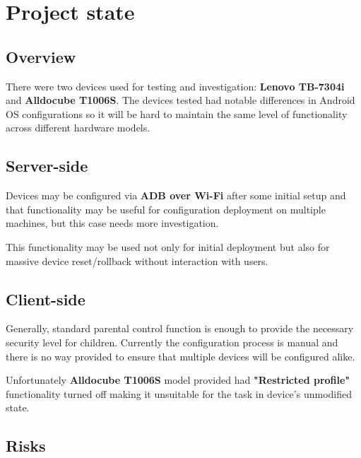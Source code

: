 \part{Project state}

\chapter{Overview}

There were two devices used for testing and investigation:
\textbf{Lenovo TB-7304i} and \textbf{Alldocube T1006S}. The devices
tested had notable differences in Android OS configurations so it
will be hard to maintain the same level of functionality across
different hardware models.

\chapter{Server-side}

Devices may be configured via \textbf{ADB over Wi-Fi} after some initial
setup and that functionality may be useful for configuration deployment
on multiple machines, but this case needs more investigation.

This functionality may be used not only for initial deployment but also
for massive device reset/rollback without interaction with users.

\chapter{Client-side}

Generally, standard parental control function is enough to provide the
necessary security level for children. Currently the configuration
process is manual and there is no way provided to ensure that multiple
devices will be configured alike.

Unfortunately \textbf{Alldocube T1006S} model provided had
\textbf{"Restricted profile"} functionality turned off making it
unsuitable for the task in device's unmodified state.


\chapter{Risks}

